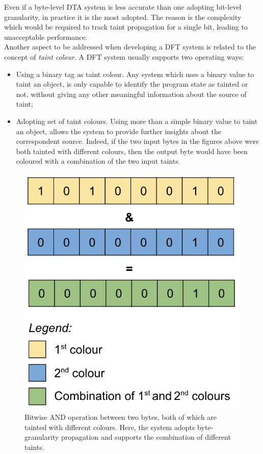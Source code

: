 \documentclass[LaM,binding=0.6cm]{sapthesis}
\begin{document}
Even if a byte-level DTA system is less accurate than one adopting bit-level granularity, in practice it is the most adopted. The reason is the complexity which would be required to track taint propagation for a single bit, leading to unacceptable performance.\\

Another aspect to be addressed when developing a DFT system is related to the concept of \textit{taint colour}. A DFT system usually supports two operating ways:
\begin{itemize}
\item Using a binary tag as taint colour. Any system which uses a binary value to taint an object, is only capable to identify the program state as tainted or not, without giving any other meaningful information about the source of taint; 
\item Adopting set of taint colours. Using more than a simple binary value to taint an object, allows the system to provide further insights about the correspondent source. Indeed, if the two input bytes in the figures above were both tainted with different colours, then the output byte would have been coloured with a combination of the two input taints.
\end{itemize}

\begin{figure}[h!]
\centering
\includegraphics[scale=.5]{images/techn4}
\caption{Bitwise AND operation between two bytes, both of which are tainted with different colours. Here, the system adopts byte-granularity propagation and supports the combination of different taints.}
\end{figure}
\end{document}
